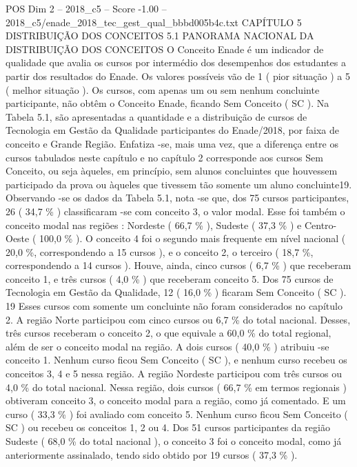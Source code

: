 \begin{textsample}{POS Dim 2 – 2018\_c5 – Score -1.00 – 2018\_c5/enade\_2018\_tec\_gest\_qual\_bbbd005b4c.txt}  \label{ex:f2_pos_319}
CAPÍTULO 5 DISTRIBUIÇÃO DOS CONCEITOS 5.1 PANORAMA NACIONAL DA DISTRIBUIÇÃO DOS CONCEITOS O Conceito Enade é um indicador de qualidade que avalia os cursos por intermédio dos desempenhos dos estudantes a partir dos resultados do Enade.
Os valores possíveis vão de 1 ( pior situação ) a 5 ( melhor situação ).
Os cursos, com apenas um ou sem nenhum concluinte participante, não obtêm o Conceito Enade, ficando Sem Conceito ( SC ).
Na Tabela 5.1, são apresentadas a quantidade e a distribuição de cursos de Tecnologia em Gestão da Qualidade participantes do Enade/2018, por faixa de conceito e Grande Região.
Enfatiza -se, mais uma vez, que a diferença entre os cursos tabulados neste capítulo e no capítulo 2 corresponde aos cursos Sem Conceito, ou seja àqueles, em princípio, sem alunos concluintes que houvessem participado da prova ou àqueles que tivessem tão somente um aluno concluinte19.
Observando -se os dados da Tabela 5.1, nota -se que, dos 75 cursos participantes, 26 ( 34,7 \% ) classificaram -se com conceito 3, o valor modal.
Esse foi também o conceito modal nas regiões : Nordeste ( 66,7 \% ), Sudeste ( 37,3 \% ) e Centro-Oeste ( 100,0 \% ).
O conceito 4 foi o segundo mais frequente em nível nacional ( 20,0 \%, correspondendo a 15 cursos ), e o conceito 2, o terceiro ( 18,7 \%, correspondendo a 14 cursos ).
Houve, ainda, cinco cursos ( 6,7 \% ) que receberam conceito 1, e três cursos ( 4,0 \% ) que receberam conceito 5.
Dos 75 cursos de Tecnologia em Gestão da Qualidade, 12 ( 16,0 \% ) ficaram Sem Conceito ( SC ). 19 Esses cursos com somente um concluinte não foram considerados no capítulo 2.
A região Norte participou com cinco cursos ou 6,7 \% do total nacional.
Desses, três cursos receberam o conceito 2, o que equivale a 60,0 \% do total regional, além de ser o conceito modal na região.
A dois cursos ( 40,0 \% ) atribuiu -se conceito 1.
Nenhum curso ficou Sem Conceito ( SC ), e nenhum curso recebeu os conceitos 3, 4 e 5 nessa região.
A região Nordeste participou com três cursos ou 4,0 \% do total nacional.
Nessa região, dois cursos ( 66,7 \% em termos regionais ) obtiveram conceito 3, o conceito modal para a região, como já comentado.
E um curso ( 33,3 \% ) foi avaliado com conceito 5.
Nenhum curso ficou Sem Conceito ( SC ) ou recebeu os conceitos 1, 2 ou 4.
Dos 51 cursos participantes da região Sudeste ( 68,0 \% do total nacional ), o conceito 3 foi o conceito modal, como já anteriormente assinalado, tendo sido obtido por 19 cursos ( 37,3 \% ).

\end{textsample}
